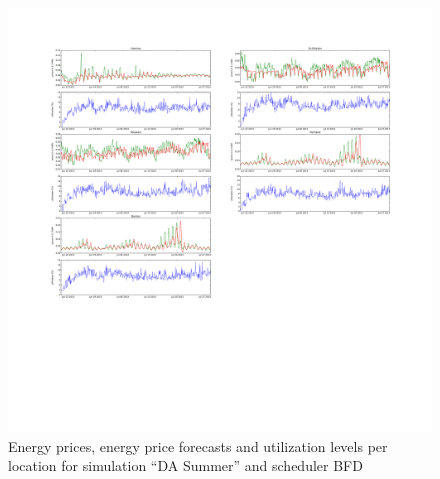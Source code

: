\begin{figure}[htbp]
	\centering
	\vspace*{-0.6in}
	\hspace*{-1.4in}
		\includegraphics[width=1.60\textwidth]{figures/appendix_simulation_results/DA_Summer_scenario_1.pdf}
	\vspace*{-2.8in}
	\caption{Energy prices, energy price forecasts and utilization levels per location for simulation ``DA Summer'' and scheduler BFD}
	\label{fig:app_DA_Summer_scenario_1}
\end{figure}

